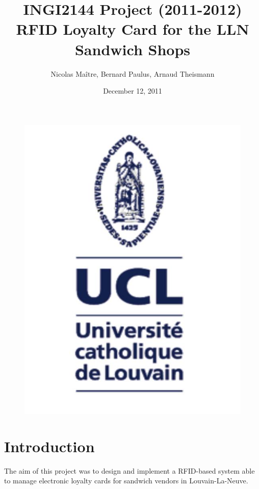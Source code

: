 \documentclass[a4paper,11pt,oneside]{article}
\begin{document}
\begin{titlepage}
	\title{INGI2144 Project (2011-2012) \\ RFID Loyalty Card for the LLN Sandwich Shops}
	\author{Nicolas Maître, Bernard Paulus, Arnaud Theismann}
	\date{December 12, 2011}
	\maketitle
	\thispagestyle{empty}	
	
	\vfill
	\begin{figure}[!ht]
		\centering
		\includegraphics[scale=0.25]{Images/UCL_Logo.jpg}
		\label{fig:UCL Logo}
	\end{figure}
\end{titlepage}

\tableofcontents

\newpage
\section{Introduction}
The aim of this project was to design and implement a RFID-based system able to manage electronic loyalty cards for sandwich vendors in Louvain-La-Neuve. \\
\end{document}
